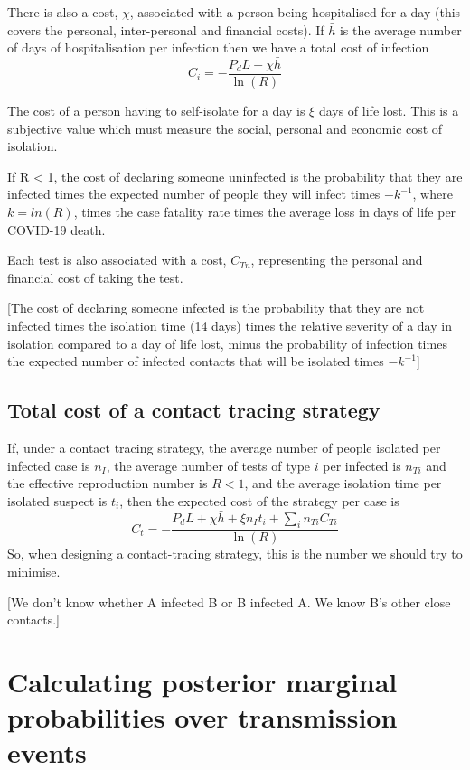 \documentclass{article}
\begin{document}
There is also a cost, $\chi$, associated with a person being hospitalised for a day (this covers the personal, inter-personal and financial costs). If $\bar{h}$ is the average number of days of hospitalisation per infection then we have a total cost of infection
\[
C_{i} = -\frac{P_dL + \chi\bar{h}}{\ln(R)}
\]

The cost of a person having to self-isolate for a day is $\xi$ days of life lost. This is a subjective value which must measure the social, personal and economic cost of isolation.

If R < 1, the cost of declaring someone uninfected is the probability that they are infected times the expected number of people they will infect times $-k^{-1}$, where $k = ln(R)$, times the case fatality rate times the average loss in days of life per COVID-19 death.

Each test is also associated with a cost, $C_{Tn}$, representing the personal and financial cost of taking the test.

[The cost of declaring someone infected is the probability that they are not infected times the isolation time (14 days) times the relative severity of a day in isolation compared to a day of life lost, minus the probability of infection times the expected number of infected contacts that will be isolated times $-k^{-1}$]

\subsection{Total cost of a contact tracing strategy}

If, under a contact tracing strategy, the average number of people isolated per infected case is $n_I$, the average number of tests of type $i$ per infected is $n_{Ti}$ and the effective reproduction number is $R<1$, and the average isolation time per isolated suspect is $t_i$, then the expected cost of the strategy per case is
\[
C_t = -\frac{P_dL + \chi\bar{h} + \xi n_It_i + \sum_i n_{Ti}C_{Ti}}{\ln(R)}
\]
So, when designing a contact-tracing strategy, this is the number we should try to minimise.

[We don't know whether A infected B or B infected A. We know B's other close contacts.]

\section{Calculating posterior marginal probabilities over transmission events}
\end{document}
